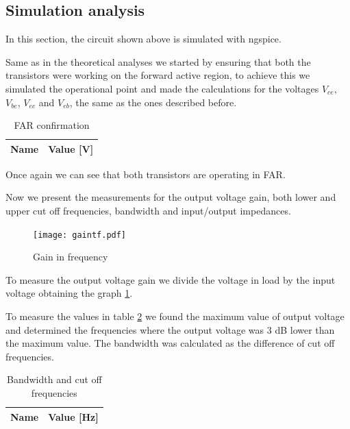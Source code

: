 \subsection{Simulation analysis}
\label{sub:s1}


In this section, the circuit shown above is simulated with ngspice.

Same as in the theoretical analyses we started by ensuring that both the transistors were working on the forward active region, to achieve this we simulated the operational
point and made the calculations for the voltages $V_{ce}$, $V_{be}$, $V_{ec}$ and $V_{eb}$, the same as the ones described before.

\begin{table}[h]
  \centering
  \begin{tabular}{|l|r|}
    \hline    
    {\bf Name} & {\bf Value [V]} \\ \hline
    
  \end{tabular}
  \caption{FAR confirmation}
  \label{tab:OP1_Values}
\end{table} 

Once again we can see that both transistors are operating in FAR. 

Now we present the measurements for the output voltage gain, both lower and upper cut off frequencies, bandwidth and input/output impedances. 

\begin{figure}[h] \centering
\texttt{[image: gaintf.pdf]}
\caption{Gain in frequency}
\label{fig:2}
\end{figure}

To measure the output voltage gain we divide the voltage in load by the input voltage obtaining the graph \ref{fig:2}.



To measure the values in table \ref{tab:low_Values} we found the maximum value of output voltage and determined the frequencies where the output voltage was 3 dB lower than 
the maximum value. The bandwidth was calculated as the difference of cut off frequencies.

\begin{table}[h]
  \centering
  \begin{tabular}{|l|r|}
    \hline    
    {\bf Name} & {\bf Value [Hz]} \\ \hline
    
  \end{tabular}
  \caption{Bandwidth and cut off frequencies}
  \label{tab:low_Values}
\end{table} 

